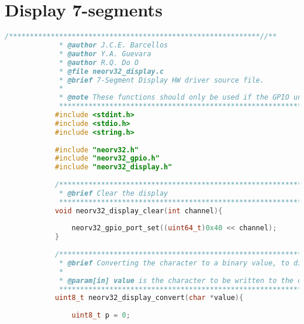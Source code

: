         \section{Display 7-segments}\label{.c:-7-segments}
        \begin{lstlisting}[style=mystyle_c, language=c, breaklines]
            /************************************************************//**
             * @author J.C.E. Barcellos
             * @author Y.A. Guevara
             * @author R.Q. Do O
             * @file neorv32_display.c
             * @brief 7-Segment Display HW driver source file.
             *
             * @note These functions should only be used if the GPIO unit was synthesized (IO_GPIO_EN = true).
             ***************************************************************/
            #include <stdint.h>
            #include <stdio.h>
            #include <string.h>
            
            #include "neorv32.h"
            #include "neorv32_gpio.h"
            #include "neorv32_display.h"
            
            /************************************************************//**
             * @brief Clear the display
             ***************************************************************/
            void neorv32_display_clear(int channel){
            
                neorv32_gpio_port_set((uint64_t)0x40 << channel);
            }
            
            /************************************************************//**
             * @brief Converting the character to a binary value, to display into the 7-segment display
             *
             * @param[in] value is the character to be written to the display.
             ***************************************************************/
            uint8_t neorv32_display_convert(char *value){
            
                uint8_t p = 0;
            

\end{lstlisting}
